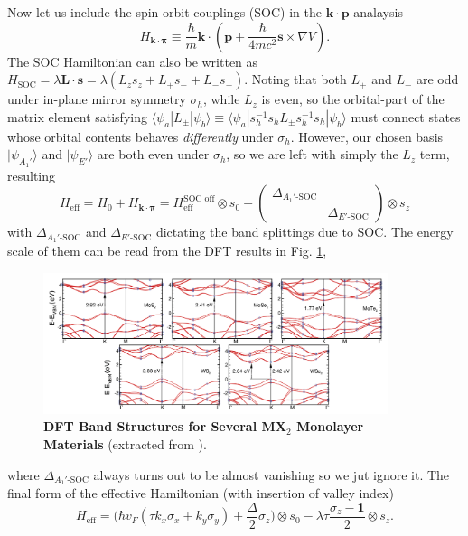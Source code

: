 Now let us include the spin-orbit couplings (SOC) in the $\bm k\cdot\bm p$ analaysis
\begin{equation*}
    H_{\bm k\cdot\bm\pi}\equiv\frac{\hbar}{m}\bm k\cdot\left(\bm p+\frac{\hbar}{4mc^2}\bm s\times\nabla V\right).
\end{equation*}
The SOC Hamiltonian can also be written as $H_{\text{SOC}}=\lambda\bm L\cdot\bm  s=\lambda(L_z s_z + L_+  s_- + L_-  s_+)$. Noting that both $L_+$ and $L_-$ are odd under in-plane mirror symmetry $\sigma_h$, while $L_z$ is even, so the orbital-part of the matrix element satisfying $\langle\psi_a|L_\pm|\psi_b\rangle\equiv\langle\psi_a| s_h^{-1}  s_h L_\pm s_h^{-1} s_h|\psi_b\rangle$ must connect states whose orbital contents behaves \emph{differently} under $\sigma_h$. However, our chosen basis $|\psi_{A_1'}\rangle$ and $|\psi_{E'}\rangle$ are both even under $\sigma_h$, so we are left with simply the $L_z$ term, resulting
\begin{equation}
    H_{\text{eff}}=H_0+H_{\bm k\cdot\bm\pi}=H_{\text{eff}}^{\text{SOC off}}\otimes s_0 + \begin{pmatrix}
        \Delta_{A_1'\text{-SOC}} &                        \\
                                 & \Delta_{E'\text{-SOC}}
    \end{pmatrix}\otimes s_z
\end{equation}
with $\Delta_{A_1'\text{-SOC}}$ and $\Delta_{E'\text{-SOC}}$ dictating the band splittings due to SOC. The energy scale of them can be read from the DFT results in Fig. \ref{fig:monolayer_TMD_band_structure},
\begin{figure}[!htp]
    \centering
    \includegraphics[width=0.9\textwidth]{figures/monolayer_TMD_band_structure.png}
    \caption{\textbf{DFT Band Structures for Several MX$_2$ Monolayer Materials} (extracted from \cite{ramasubramaniam2012large}).}
    \label{fig:monolayer_TMD_band_structure}
\end{figure}
where $\Delta_{A_1'\text{-SOC}}$ always turns out to be almost vanishing so we jut ignore it. The final form of the effective Hamiltonian (with insertion of valley index)
\begin{equation}\label{eq:MoS2 kdotp}
    H_{\text{eff}}=\bigg(\hbar v_F(\tau k_x\sigma_x+k_y\sigma_y)+\frac{\Delta}{2}\sigma_z\bigg)\otimes s_0 - \lambda\tau\frac{\sigma_z-\mathbf 1}{2}\otimes s_z.
\end{equation}



